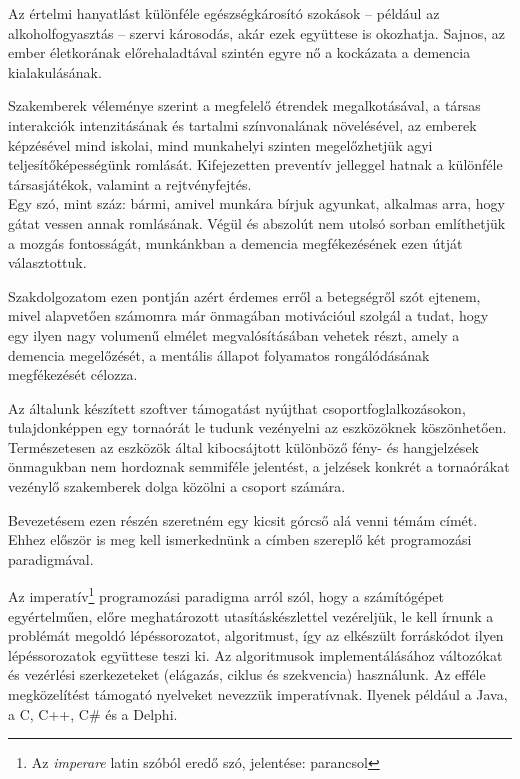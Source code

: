 \documentclass[tocnopagenum]{thesis-ekf}
\begin{document}
	Az értelmi hanyatlást különféle egészségkárosító szokások -- például az alkoholfogyasztás -- szervi károsodás, akár ezek együttese is okozhatja. Sajnos, az ember életkorának előrehaladtával szintén egyre nő a kockázata a demencia kialakulásának.
	
	Szakemberek véleménye szerint a megfelelő étrendek megalkotásával, a társas interakciók intenzitásának és tartalmi színvonalának növelésével, az emberek képzésével mind iskolai, mind munkahelyi szinten megelőzhetjük agyi teljesítőképességünk romlását. 
	Kifejezetten  preventív jelleggel hatnak a különféle társasjátékok, valamint a rejtvényfejtés.\\Egy szó, mint száz: bármi, amivel munkára bírjuk agyunkat, alkalmas arra, hogy gátat vessen annak romlásának.
	Végül és abszolút nem utolsó sorban említhetjük a mozgás fontosságát, munkánkban a demencia megfékezésének ezen útját választottuk.
	
	Szakdolgozatom ezen pontján azért érdemes erről a betegségről szót ejtenem, mivel alapvetően számomra már önmagában motivációul szolgál a tudat, hogy egy ilyen nagy volumenű elmélet megvalósításában vehetek részt, amely a demencia megelőzését, a mentális állapot folyamatos rongálódásának megfékezését célozza. 
	\cite{dementia1}
	\cite{dementia2}
	\cite{dementia3}
	
	Az általunk készített szoftver támogatást nyújthat csoportfoglalkozásokon, tulajdonképpen egy tornaórát le tudunk vezényelni az eszközöknek köszönhetően. Természetesen az eszközök által kibocsájtott különböző fény- és hangjelzések önmagukban nem hordoznak semmiféle jelentést, a jelzések konkrét  a tornaórákat vezénylő szakemberek dolga közölni a csoport számára.
	
	Bevezetésem ezen részén szeretném egy kicsit górcső alá venni témám címét. Ehhez először is meg kell ismerkednünk a címben szereplő két programozási paradigmával.
	
	Az imperatív\footnote{Az \textit{imperare} latin szóból eredő szó, jelentése: parancsol} programozási paradigma arról szól, hogy a számítógépet egyértelműen, előre meghatározott utasításkészlettel vezéreljük, le kell írnunk a problémát megoldó lépéssorozatot, algoritmust, így az elkészült forráskódot ilyen lépéssorozatok együttese teszi ki. Az algoritmusok implementálásához változókat és vezérlési szerkezeteket (elágazás, ciklus és szekvencia) használunk. Az efféle megközelítést támogató nyelveket nevezzük imperatívnak. Ilyenek például a Java, a C, C++, C\# és a Delphi.
	
\end{document}
